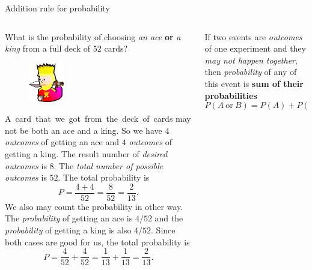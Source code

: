 \documentclass[9pt,aspectratio=169]{beamer}
\begin{document}
\begin{frame}{Addition rule for probability}
  \begin{columns}[T]
    \begin{column}{0.5\textwidth}
      \begin{problem}
        What is the probability of choosing \emph{an ace} \textbf{or} \emph{a king} from a full deck of $52$ cards?
      \end{problem}
      \begin{figure}%
        \vspace{-1em}
        \includegraphics[width=0.25\textwidth]{03 - Probability/king-clip-art.png}
      \end{figure}
      \mbox{A card that we got from the deck of cards} may not be both an ace and a king. So we have $4$ \emph{outcomes} of getting an ace and $4$ \emph{outcomes} of getting a king. The result number of \emph{desired outcomes} is $8$. The \emph{total number of possible outcomes} is $52$.
      The total probability is
      \[ P = \frac{4 + 4}{52} = \frac{8}{52} = \frac{2}{13}. \]
      We also may count the probability in other way. The \emph{probability} of getting an ace is $4/52$ and the \emph{probability} of getting a king is also $4/52$. Since both cases are good for us, the total probability is
      \[ P = \frac{4}{52} + \frac{4}{52} = \frac{1}{13} + \frac{1}{13} = \frac{2}{13}. \]
    \end{column}
    \begin{column}{0.5\textwidth}
      \begin{definition}
        If two events are \emph{outcomes} of one experiment and they \emph{may not happen together}, then \emph{probability} of any of this event is \textbf{sum of their probabilities}
        \[ P(A\ \text{or}\ B) = P(A) + P(B). \]
        \vspace*{-2.5ex}          
      \end{definition}


\end{column}
\end{columns}
\end{frame}
\end{document}
